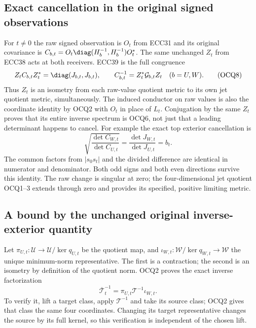 \subsection{Exact cancellation in the original signed observations}
For $t\ne0$ the raw signed observation is $O_t$ from ECC31 and its
original covariance is $C_{b,t}=O_t\diag(H_b^{-1},H_b^{-1})O_t^*$.
The same unchanged $Z_t$ from ECC38 acts at both receivers. ECC39 is
the full congruence
\[
 Z_tC_{b,t}Z_t^*=\diag(J_{b,t},J_{b,t}),\qquad
 C_{b,t}^{-1}=Z_t^*\mathcal G_{b,t}Z_t\quad(b=U,W).
 \tag{OCQ8}
\]
Thus $Z_t$ is an isometry from each raw-value quotient metric to its
own jet quotient metric, simultaneously. The induced conductor on raw
values is also the coordinate identity by OCQ2 with $O_t$ in place
of $L_t$. Conjugation by the same $Z_t$ proves that its entire inverse
spectrum is OCQ6, not just that a leading determinant happens to cancel.
For example the exact top exterior cancellation is
\[
 \sqrt{\frac{\det C_{W,t}}{\det C_{U,t}}}
 =\frac{\det J_{W,t}}{\det J_{U,t}}=b_t.
 \tag{OCQ9}
\]
The common factors from $|s_0s_t|$ and the divided difference are
identical in numerator and denominator. Both odd signs and both even
directions survive this identity. The raw change is singular at zero;
the four-dimensional jet quotient OCQ1--3 extends through zero and
provides its specified, positive limiting metric.

\subsection{A bound by the unchanged original inverse-exterior quantity}
Let $\pi_{U,t}:\mathcal U\to\mathcal U/\ker q_{U,t}$ be the
quotient map, and $\iota_{W,t}:\mathcal W/\ker q_{W,t}\to\mathcal W$
the unique minimum-norm representative. The first is a contraction;
the second is an isometry by definition of the quotient norm. OCQ2
proves the exact inverse factorization
\[
 \overline{\mathcal T}_t^{-1}
   =\pi_{U,t}\mathcal T^{-1}\iota_{W,t}.
 \tag{OCQ10}
\]
To verify it, lift a target class, apply $\mathcal T^{-1}$ and take
its source class; OCQ2 gives that class the same four coordinates.
Changing its target representative changes the source by its full
kernel, so this verification is independent of the chosen lift.

